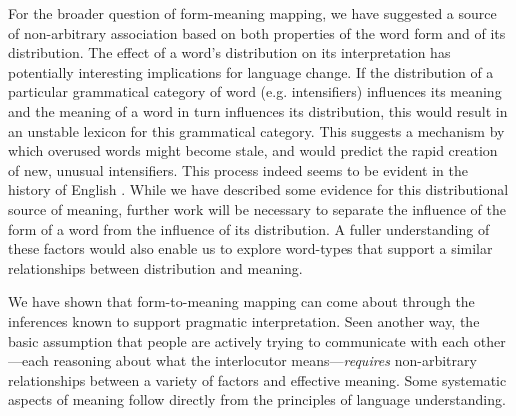 \documentclass[10pt,letterpaper]{article}
\newcommand{\todo}[1]{{\color{red}#1}}
\begin{document}
For the broader question of form-meaning mapping, we have suggested a source of non-arbitrary association based on both properties of the word form and of its distribution. The effect of a word's distribution on its interpretation has potentially interesting implications for language change. If the distribution of a particular grammatical category of word (e.g. intensifiers) influences its meaning and the meaning of a word in turn influences its distribution, this would result in an unstable lexicon for this grammatical category. This suggests a mechanism by which overused words might become stale, and would predict the rapid creation of new, unusual intensifiers. This process indeed seems to be evident in the history of English \cite{bolinger}. While we have described some evidence for this distributional source of meaning, further work will be necessary to separate the influence of the form of a word from the influence of its distribution. A fuller understanding of these factors would also enable us to explore word-types that support a similar relationships between distribution and meaning.


We have shown that form-to-meaning mapping can come about through the inferences known to support pragmatic interpretation.
Seen another way, the basic assumption that people are actively trying to communicate with each other---each reasoning about what the interlocutor means---\emph{requires} non-arbitrary relationships between a variety of factors and effective meaning.
Some systematic aspects of meaning follow directly from the principles of language understanding.
\end{document}
